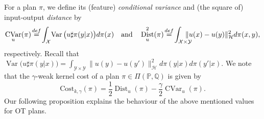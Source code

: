 \documentclass{article} %
\DeclareMathOperator{\Var}{Var}
\DeclareMathOperator{\CVar}{CVar}
\DeclareMathOperator{\Dist}{Dist}
\begin{document}
For a plan $\pi$, we define its (feature) \textit{conditional variance} and (the square of) input-output \textit{distance} by
\begin{equation}\CVar_{u}(\pi)\!\stackrel{def}{=}\!\int_{\mathcal{X}}\!\Var\big(u\sharp\pi(y|x)\big)d\mathbb{\pi}(x)\quad\text{and}\quad\Dist_{u}^{2}(\pi)\!\stackrel{def}{=}\!\int_{\mathcal{X}\times\mathcal{Y}}\hspace{-4mm}\|u(x)-u(y)\|_{\mathcal{H}}^{2}d\pi(x,y),
\label{kernel-var-def}
\end{equation}
respectively. Recall that $\Var\big(u\sharp\pi(y|x)\big)=\int_{\mathcal{Y}\times\mathcal{Y}}\|u(y)-u(y')\|_{\mathcal{H}}^{2}d\pi(y|x)d\pi(y'|x)$. We note that the $\gamma$-weak kernel cost of a plan $\pi\in\Pi(\mathbb{P},\mathbb{Q})$ is given by
\begin{equation}\text{Cost}_{k,\gamma}(\pi)=\frac{1}{2}\Dist_{u}(\pi)-\frac{\gamma}{2}\CVar_{u}(\pi).
\label{cost-through-var-dist}
\end{equation}
Our following proposition explains the behaviour of the above mentioned values for OT plans.
\end{document}
